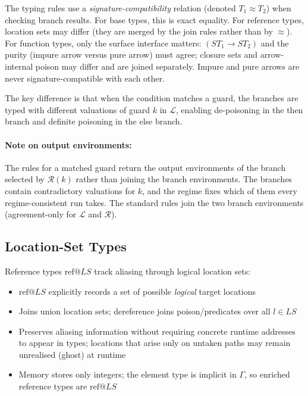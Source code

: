 \documentclass[12pt]{article}
\begin{document}
The typing rules use a \emph{signature-compatibility} relation (denoted
$T_1 \approx T_2$) when checking branch results. For base types, this is exact
equality. For reference types, location sets may
differ (they are merged by the join rules rather than by $\approx$). For
function types, only the surface interface matters: $(ST_1 \rightarrow ST_2)$
and the purity (impure arrow versus pure arrow) must agree; closure sets and
arrow-internal poison may differ and are joined separately. Impure and pure
arrows are never signature-compatible with each other.

The key difference is that when the condition matches a guard, the branches are typed
with different valuations of guard $k$ in $\mathcal{L}$, enabling de-poisoning
in the then branch and definite poisoning in the else branch.

\paragraph{Note on output environments:} The rules for a matched guard
return the output environments of the branch selected by $\mathcal{R}(k)$ rather
than joining the branch environments. The branches contain
contradictory valuations for $k$, and the regime fixes which of them every
regime-consistent run takes. The standard rules join the two branch
environments (agreement-only for $\mathcal{L}$ and $\mathcal{R}$).

\subsection{Location-Set Types}

Reference types $\text{ref} @ LS$ track aliasing through logical location sets:
\begin{itemize}
    \item $\text{ref} @ LS$ explicitly records a set of possible \emph{logical} target locations
    \item Joins union location sets; dereference joins poison/predicates over all $l \in LS$
    \item Preserves aliasing information without requiring concrete runtime addresses to appear in types; locations that arise only on untaken paths may remain unrealised (ghost) at runtime
    \item Memory stores only integers; the element type is implicit in $\Gamma$, so enriched reference types are $\text{ref} @ LS$
\end{itemize}
\end{document}
